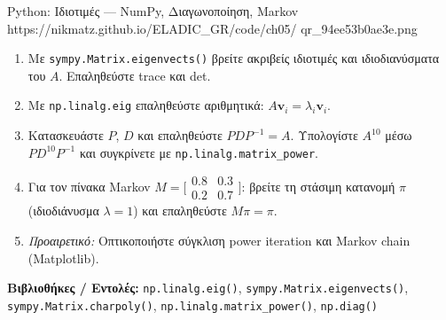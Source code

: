 \begin{pybox}{Python: Ιδιοτιμές — NumPy, Διαγωνοποίηση, Markov}%
             {https://nikmatz.github.io/ELADIC_GR/code/ch05/}%
             {qr_94ee53b0ae3e.png}
\label{py:ch5_eigenvalues}
\begin{enumerate}[label=(\alph*),itemsep=2pt]
  \item Με \texttt{sympy.Matrix.eigenvects()} βρείτε ακριβείς ιδιοτιμές
    και ιδιοδιανύσματα του $A$. Επαληθεύστε trace και det.
  \item Με \texttt{np.linalg.eig} επαληθεύστε αριθμητικά:
    $A\mathbf{v}_i = \lambda_i\mathbf{v}_i$.
  \item Κατασκευάστε $P$, $D$ και επαληθεύστε $PDP^{-1}=A$.
    Υπολογίστε $A^{10}$ μέσω $PD^{10}P^{-1}$ και συγκρίνετε με
    \texttt{np.linalg.matrix\_power}.
  \item Για τον πίνακα Markov
    $M=\bigl[\begin{smallmatrix}0.8&0.3\\0.2&0.7\end{smallmatrix}\bigr]$:
    βρείτε τη στάσιμη κατανομή $\pi$ (ιδιοδιάνυσμα $\lambda=1$)
    και επαληθεύστε $M\pi=\pi$.
  \item \textit{Προαιρετικό:} Οπτικοποιήστε σύγκλιση power iteration
    και Markov chain (Matplotlib).
\end{enumerate}
\medskip
\textbf{Βιβλιοθήκες / Εντολές:}
\texttt{np.linalg.eig()}, \texttt{sympy.Matrix.eigenvects()},
\texttt{sympy.Matrix.charpoly()},
\texttt{np.linalg.matrix\_power()}, \texttt{np.diag()}
\end{pybox}
